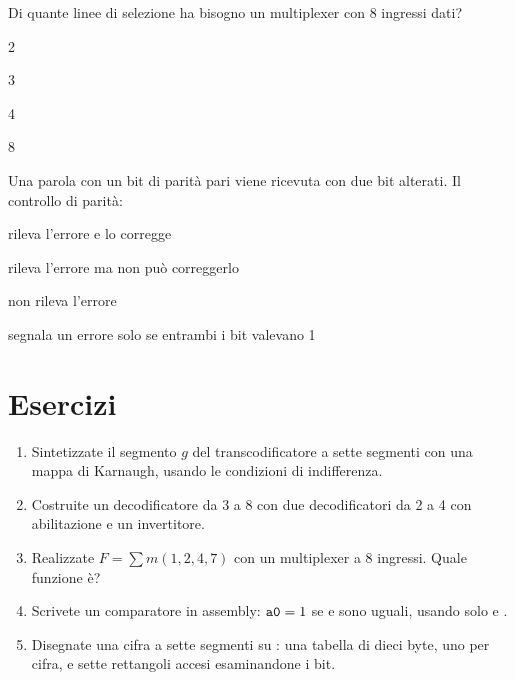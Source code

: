 \begin{quiz}{Di quante linee di selezione ha bisogno un multiplexer con 8 ingressi dati?}
\item 2
\item 3
\item 4
\item 8
\end{quiz}

\begin{quiz}{Una parola con un bit di parità pari viene ricevuta con due bit alterati. Il controllo di parità:}
\item rileva l'errore e lo corregge
\item rileva l'errore ma non può correggerlo
\item non rileva l'errore
\item segnala un errore solo se entrambi i bit valevano 1
\end{quiz}

\section{Esercizi}

\begin{exercise}
\begin{enumerate}[nosep]
\item Sintetizzate il segmento $g$ del transcodificatore a sette segmenti con
  una mappa di Karnaugh, usando le condizioni di indifferenza.
\item Costruite un decodificatore da 3 a 8 con due decodificatori da 2 a 4 con
  abilitazione e un invertitore.
\item Realizzate $F=\sum m(1,2,4,7)$ con un multiplexer a 8 ingressi. Quale
  funzione è?
\item Scrivete un comparatore in assembly: $\texttt{a0}=1$ se  e 
  sono uguali, usando solo  e .
\item Disegnate una cifra a sette segmenti su \prg: una tabella di dieci byte,
  uno per cifra, e sette rettangoli accesi esaminandone i bit.
\end{enumerate}
\end{exercise}

